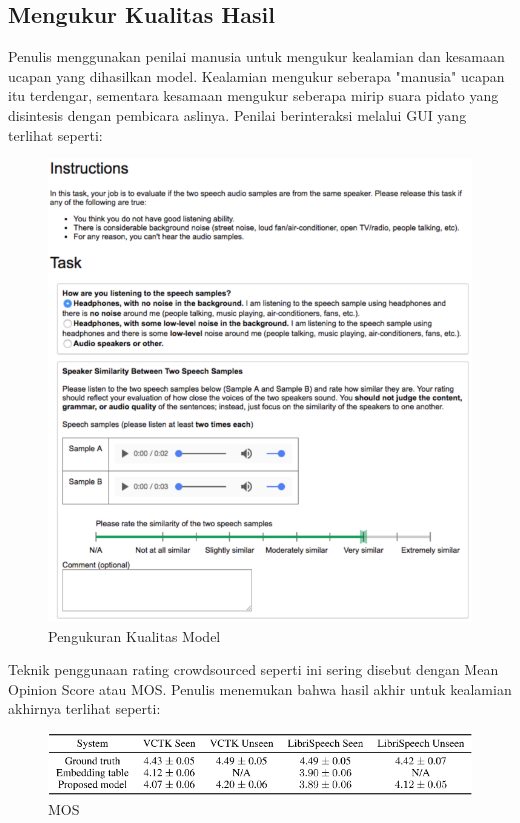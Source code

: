 \subsection{Mengukur Kualitas Hasil}
Penulis menggunakan penilai manusia untuk mengukur kealamian dan kesamaan ucapan yang dihasilkan model.
Kealamian mengukur seberapa "manusia" ucapan itu terdengar, sementara kesamaan mengukur seberapa mirip suara pidato yang disintesis dengan pembicara aslinya.
Penilai berinteraksi melalui GUI yang terlihat seperti:
\begin{figure}[H]
        \centerline{\includegraphics[scale=.45]{figures/nilai}}
        \caption{Pengukuran Kualitas Model\cite{DBLP:journals/corr/abs-1806-04558}}
		\label{nilai}
\end{figure}
Teknik penggunaan rating crowdsourced seperti ini sering disebut dengan Mean Opinion Score atau MOS.
Penulis menemukan bahwa hasil akhir untuk kealamian akhirnya terlihat seperti:
\begin{figure}[H]
        \centerline{\includegraphics[scale=.45]{figures/hasil}}
        \caption{MOS \cite{DBLP:journals/corr/abs-1806-04558}}
		\label{mos}
\end{figure}

